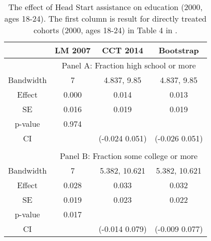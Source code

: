 \documentclass[12pt,fleqn]{article}
\begin{document}
\begin{table}[ht]
	\centering
	\begin{tabular}{cccc}
		\toprule
		& LM 2007 & CCT 2014 & Bootstrap \\
		\midrule
		& \multicolumn{3}{c}{Panel A: Fraction high school or more} \\
		Bandwidth & 7 & 4.837, 9.85 & 4.837, 9.85 \\
		Effect    & 0.000 & 0.014 & 0.013 \\
		SE        & 0.016 & 0.019 & 0.019 \\
		p-value   & 0.974 & & \\
		CI        & & (-0.024 0.051) & (-0.026 0.051) \\

		&&& \\
		& \multicolumn{3}{c}{Panel B: Fraction some college or more} \\
		Bandwidth & 7 & 5.382, 10.621 & 5.382, 10.621 \\
		Effect    & 0.028 & 0.033 & 0.032 \\
		SE        & 0.019 & 0.023 & 0.022 \\
		p-value   & 0.017 & & \\
		CI        & & (-0.014 0.079) & (-0.009 0.077)\\
		\bottomrule
	\end{tabular}
	\caption{The effect of Head Start assistance on education (2000, ages 18-24). The first column is result for directly treated cohorts (2000, ages 18-24) in Table 4 in \cite{ludwig2007}.}
	\label{tab: education 2000 ages 18-24}
\end{table}
\end{document}
